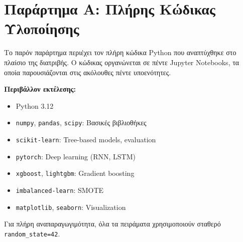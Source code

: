 \section{Παράρτημα Α: Πλήρης Κώδικας Υλοποίησης}
 
Το παρόν παράρτημα περιέχει τον πλήρη κώδικα Python που αναπτύχθηκε στο πλαίσιο της διατριβής. Ο κώδικας οργανώνεται σε πέντε Jupyter Notebooks, τα οποία παρουσιάζονται στις ακόλουθες πέντε υποενότητες.
 
\textbf{Περιβάλλον εκτέλεσης:}
\begin{itemize}
\item Python 3.12
\item \texttt{numpy}, \texttt{pandas}, \texttt{scipy}: Βασικές βιβλιοθήκες
\item \texttt{scikit-learn}: Tree-based models, evaluation
\item \texttt{pytorch}: Deep learning (RNN, LSTM)
\item \texttt{xgboost}, \texttt{lightgbm}: Gradient boosting
\item \texttt{imbalanced-learn}: SMOTE
\item \texttt{matplotlib}, \texttt{seaborn}: Visualization
\end{itemize}
 
Για πλήρη αναπαραγωγιμότητα, όλα τα πειράματα χρησιμοποιούν σταθερό \texttt{random\_state=42}.
 
 
 
